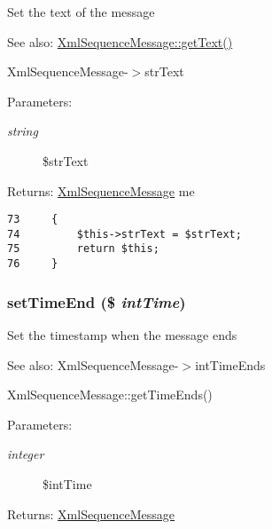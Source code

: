 Set the text of the message

\begin{Desc}
\item[See also:]\hyperlink{class_xml_sequence_message_8a2999b1d846c0a7bc77187e28facd99}{XmlSequenceMessage::getText()} 

XmlSequenceMessage-$>$strText \end{Desc}
\begin{Desc}
\item[Parameters:]
\begin{description}
\item[{\em string}]\$strText \end{description}
\end{Desc}
\begin{Desc}
\item[Returns:]\hyperlink{class_xml_sequence_message}{XmlSequenceMessage} me \end{Desc}


\begin{Code}\begin{verbatim}73     {
74         $this->strText = $strText;
75         return $this;
76     }
\end{verbatim}
\end{Code}


\hypertarget{class_xml_sequence_message_c7e86ac9821f16f99b51d69c03f522bc}{
\subsubsection[{setTimeEnd}]{\setlength{\rightskip}{0pt plus 5cm}setTimeEnd (\$ {\em intTime})}}
\label{class_xml_sequence_message_c7e86ac9821f16f99b51d69c03f522bc}


Set the timestamp when the message ends

\begin{Desc}
\item[See also:]XmlSequenceMessage-$>$intTimeEnds 

XmlSequenceMessage::getTimeEnds() \end{Desc}
\begin{Desc}
\item[Parameters:]
\begin{description}
\item[{\em integer}]\$intTime \end{description}
\end{Desc}
\begin{Desc}
\item[Returns:]\hyperlink{class_xml_sequence_message}{XmlSequenceMessage} \end{Desc}


